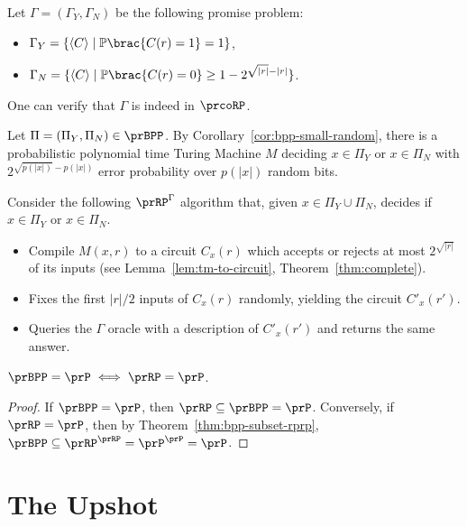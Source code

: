 \begin{proofsk}
    Let $\Gamma = (\Gamma_Y, \Gamma_N)$ be the following promise problem:
    \begin{itemize}
        \item $\Gamma_Y = \set{\langle C \rangle \mid \Pr\brac{C(r) = 1} = 1}$,
        \item $\Gamma_N = \set{\langle C \rangle \mid \Pr\brac{C(r) = 0} \geq 1 - 2^{\sqrt{|r|} - |r|}}$.
    \end{itemize}
    One can verify that $\Gamma$ is indeed in $\prcoRP$.

    Let $\Pi = (\Pi_Y, \Pi_N) \in \prBPP$.
    By Corollary~\ref{cor:bpp-small-random}, there is a probabilistic polynomial time 
    Turing Machine $M$ deciding $x \in \Pi_Y$ or $x \in \Pi_N$ with $2^{\sqrt{p(|x|)} 
    - p(|x|)}$ error probability over $p(|x|)$ random bits.
    
    Consider the following $\prRP^\Gamma$ algorithm that, given $x \in \Pi_Y \cup \Pi_N$, 
    decides if $x \in \Pi_Y$ or $x \in \Pi_N$.
    \begin{itemize}
        \item Compile $M(x,r)$ to a circuit $C_x(r)$ which accepts or rejects at most 
            $2^{\sqrt{|r|}}$ of its inputs (see Lemma~\ref{lem:tm-to-circuit}, 
            Theorem~\ref{thm:complete}).
        \item Fixes the first $|r|/2$ inputs of $C_x(r)$ randomly, yielding the circuit 
            $C'_x(r')$.
        \item Queries the $\Gamma$ oracle with a description of $C'_x(r')$ and returns 
            the same answer.
    \end{itemize}

\end{proofsk}

\begin{corollary}
    $\prBPP = \prP \iff \prRP = \prP$.
\end{corollary}

\begin{proof}
    If $\prBPP = \prP$, then $\prRP \subseteq \prBPP = \prP$.
    Conversely, if $\prRP = \prP$, then by Theorem~\ref{thm:bpp-subset-rprp}, $\prBPP \subseteq \prRP^\prRP = \prP^\prP
    = \prP$.
\end{proof}

\section*{The Upshot}


